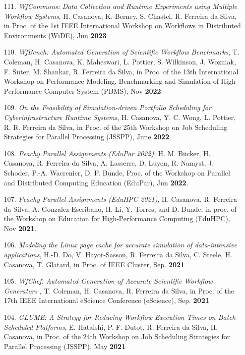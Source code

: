 \begin{enumerate}
    \item [111.] {\it WfCommons: Data Collection and Runtime Experiments using Multiple Workflow Systems}, H. Casanova, K. Berney, S. Chastel, R. Ferreira da Silva, in Proc. of the 1st IEEE International Workshop on Workflows in Distributed Environments (WiDE), Jun {\bf 2023}

    \item [110.] {\it WfBench: Automated Generation of Scientific Workflow Benchmarks}, T. Coleman, H. Casanova, K. Maheswari, L. Pottier, S. Wilkinson, J. Wozniak, F. Suter, M. Shankar, R. Ferreira da Silva, in Proc. of the 13th International Workshop on Performance Modeling, Benchmarking and Simulation of High Performance Computer System (PBMS), Nov {\bf 2022}


\item [109.] {\it On the Feasibility of Simulation-driven Portfolio Scheduling for Cyberinfrastructure Runtime Systems}, H. Casanova, Y. C. Wong, L. Pottier, R. R. Ferreira da Silva, in Proc. of the 25th Workshop on Job Scheduling Strategies for Parallel Processing (JSSPP), June {\bf 2022}

\item [108.] {\it Peachy Parallel Assignments (EduPar 2022)}, 
H. M. B\"ucker, H. Casanova, R. Ferreira da Silva, A. Lasserre, D. Luyen, R. Namyst, J. Schoder, P.-A. Wacrenier, D. P. Bunde, Proc. of the Workshop on Parallel and Distributed Computing Education (EduPar), Jun {\bf 2022}.

\item [107.] {\it Peachy Parallel Assignments (EduHPC 2021)}, H.  Casanova.
R. Ferreira da Silva, A. Gonzalez-Escribano, H. Li, Y. Torres, and D.
Bunde, in proc. of the Workshop on Education for High-Performance Computing
(EduHPC), Nov {\bf 2021}.


    \item [106.] {\it Modeling the Linux page cache for accurate simulation of data-intensive applications}, H.-D. Do, V. Hayot-Sasson, R. Ferreira da Silva, C. Steele, H. Casanova, T. Glatard, in Proc. of IEEE Cluster, Sep. {\bf 2021}

    \item [105.] {\it WfChef: Automated Generation of Accurate Scientific Workflow Generators
}, T. Coleman, H. Casanova, R. Ferreira da Silva, in Proc. of the 17th IEEE International eScience Conference (eScience), Sep. {\bf 2021}

    \item [104.] {\it GLUME: A Strategy for Reducing Workflow Execution Times on Batch-Scheduled Platforms}, E. Hataishi, P.-F. Dutot, R. Ferreira da Silva, H. Casanova, in Proc. of the 24th Workshop on Job Scheduling Strategies for Parallel Processing (JSSPP), May {\bf 2021}


\end{enumerate}
